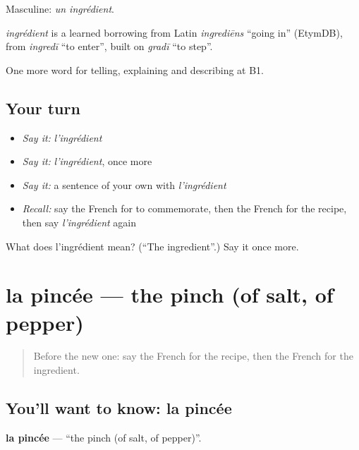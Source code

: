 Masculine: \emph{un ingrédient}.

\begin{cousinweb}
\emph{ingrédient} is a learned borrowing from Latin \emph{ingrediēns} \textquotedblleft{}going in\textquotedblright{} (EtymDB), from \emph{ingredī} \textquotedblleft{}to enter\textquotedblright{}, built on \emph{gradī} \textquotedblleft{}to step\textquotedblright{}.
\end{cousinweb}

\begin{grammarlens}[title={What you've built}]
One more word for telling, explaining and describing at B1.
\end{grammarlens}

\subsection*{Your turn}
\begin{itemize}
\raggedright
  \item \emph{Say it:} \emph{l'ingrédient}
  \item \emph{Say it:} \emph{l'ingrédient}, once more
  \item \emph{Say it:} a sentence of your own with \emph{l'ingrédient}
  \item \emph{Recall:} say the French for to commemorate, then the French for the recipe, then say \emph{l'ingrédient} again
\end{itemize}

\begin{tcolorbox}[breakable,colback=teal!4,colframe=teal!35!black,title={Before you move on}]
What does l'ingrédient mean? (\textquotedblleft{}The ingredient\textquotedblright{}.) Say it once more.
\end{tcolorbox}
\section[la pincée]{la pincée — the pinch (of salt, of pepper)}

\label{lesson:FR-C327-pincee}



\begin{quote}
Before the new one: say the French for the recipe, then the French for the ingredient.
\end{quote}

\subsection*{You'll want to know: la pincée}
\textbf{la pincée} — \textquotedblleft{}the pinch (of salt, of pepper)\textquotedblright{}.

